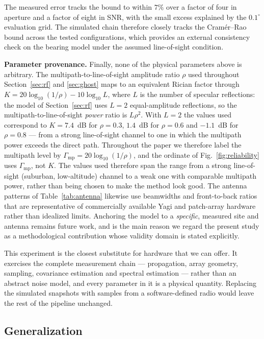 \documentclass[preprint,12pt,3p]{elsarticle}
\theoremstyle{definition}
\begin{document}
The measured error tracks the bound to within $7\%$ over a factor of four in aperture and a factor
of eight in SNR, with the small excess explained by the $0.1^\circ$ evaluation grid. The simulated
chain therefore closely tracks the Cram\'er--Rao bound across the tested configurations, which
provides an external consistency check on the bearing model under the assumed line-of-sight
condition.

\noindent\textbf{Parameter provenance.} Finally, none of the physical parameters above is
arbitrary. The multipath-to-line-of-sight amplitude ratio $\rho$ used throughout
Section~\ref{sec:rf} and \ref{sec:ghost} maps to an equivalent Rician factor through $K=20\log_{10}(1/\rho)-10\log_{10}L$, where
$L$ is the number of specular reflections: the model of Section~\ref{sec:rf} uses $L=2$
equal-amplitude reflections, so the multipath-to-line-of-sight \emph{power} ratio is $L\rho^2$.
With $L=2$ the values used correspond to $K=7.4$~dB for $\rho=0.3$, $1.4$~dB for $\rho=0.6$ and
$-1.1$~dB for $\rho=0.8$ --- from a strong line-of-sight channel to one in which the multipath
power exceeds the direct path. Throughout the paper we therefore label the multipath level by $\Gamma_{\mathrm{mp}}=20\log_{10}(1/\rho)$, and the ordinate of Fig.~\ref{fig:reliability} uses $\Gamma_{\mathrm{mp}}$, not $K$. The values used therefore span the range from a strong line-of-sight
(suburban, low-altitude) channel to a weak one with comparable multipath power, rather than being
chosen to make the method look good. The antenna patterns of Table~\ref{tab:antenna} likewise use
beamwidths and front-to-back ratios that are representative of commercially available Yagi and
patch-array hardware rather than idealized limits. Anchoring the model to a \emph{specific},
measured site and antenna remains future work, and is the main reason we regard the present study
as a methodological contribution whose validity domain is stated explicitly.

This experiment is the closest substitute for hardware that we can offer. It exercises the
complete measurement chain --- propagation, array geometry, sampling, covariance estimation and
spectral estimation --- rather than an abstract noise model, and every parameter in it is a
physical quantity. Replacing the simulated snapshots with samples from a software-defined radio
would leave the rest of the pipeline unchanged.

\subsection{Generalization}
\end{document}
